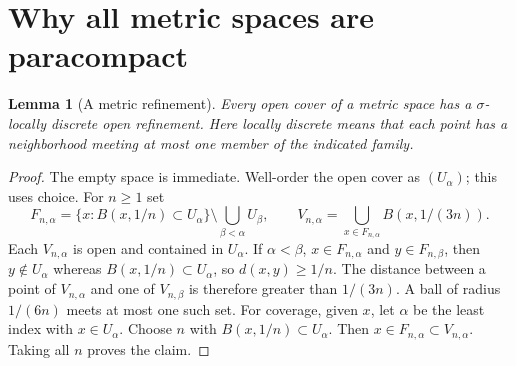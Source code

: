 \documentclass[11pt,oneside,openany]{book}
\newtheorem{lemma}[theorem]{Lemma}
\theoremstyle{definition}
\theoremstyle{remark}
\begin{document}
\section{Why all metric spaces are paracompact}
\begin{lemma}[A metric refinement]\label{d10:15:metric-sigma}
Every open cover of a metric space has a $\sigma$-locally discrete open
refinement. Here locally discrete means that each point has a neighborhood
meeting at most one member of the indicated family.
\end{lemma}
\begin{proof}
The empty space is immediate. Well-order the open cover as $(U_\alpha)$;
this uses choice. For $n\geq1$ set
\[
 F_{n,\alpha}=\{x:B(x,1/n)\subset U_\alpha\}
                 \setminus\bigcup_{\beta<\alpha}U_\beta,\qquad
 V_{n,\alpha}=\bigcup_{x\in F_{n,\alpha}} B(x,1/(3n)).
\]
Each $V_{n,\alpha}$ is open and contained in $U_\alpha$. If $\alpha<\beta$,
$x\in F_{n,\alpha}$ and $y\in F_{n,\beta}$, then $y\notin U_\alpha$
whereas $B(x,1/n)\subset U_\alpha$, so $d(x,y)\geq1/n$.
The distance between a point of $V_{n,\alpha}$ and one of $V_{n,\beta}$
is therefore greater than $1/(3n)$. A ball of radius $1/(6n)$ meets
at most one such set. For coverage, given $x$, let $\alpha$ be the least
index with $x\in U_\alpha$. Choose $n$ with $B(x,1/n)\subset U_\alpha$.
Then $x\in F_{n,\alpha}\subset V_{n,\alpha}$. Taking all $n$ proves the claim.
\end{proof}
\end{document}
